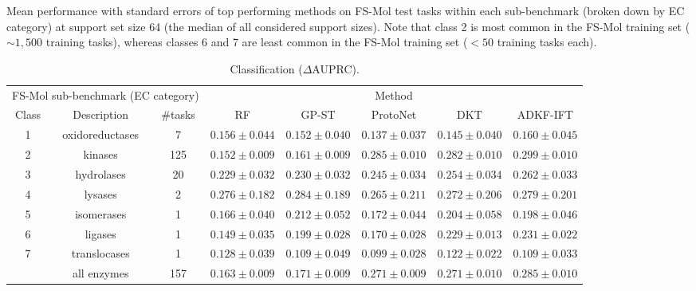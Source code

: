         \begin{table}[ht]
            \tiny
            \caption[Sub-benchmark results on FS-Mol.]{Mean performance with standard errors of top performing methods on FS-Mol test tasks within each sub-benchmark (broken down by EC category) at support set size 64 (the median of all considered support sizes). Note that class 2 is most common in the FS-Mol training set ($\sim 1,500$ training tasks), whereas classes 6 and 7 are least common in the FS-Mol training set ($<50$ training tasks each).}
            \label{tab:sub-benchmark}
            \begin{subtable}{1.0\linewidth}
                \caption{Classification ($\Delta$AUPRC).}
                \centering
                \begin{tabular}{cccccccc}
                \toprule
                \multicolumn{3}{c}{FS-Mol sub-benchmark (EC category)} & \multicolumn{5}{c}{Method} \\
                \cmidrule(lr){1-3}\cmidrule(lr){4-8}
                Class & Description & \#tasks & RF & GP-ST & ProtoNet & DKT & ADKF-IFT \\
                \midrule
                1 & oxidoreductases & 7 & $0.156\pm 0.044$ & $0.152\pm 0.040$ & $0.137\pm 0.037$ & $0.145\pm 0.040$ & $\mathbf{0.160\pm 0.045}$ \\
                2 & kinases & 125 & $0.152\pm 0.009$ & $0.161\pm 0.009$ & $0.285\pm 0.010$ & $0.282\pm 0.010$ & $\mathbf{0.299\pm 0.010}$ \\
                3 & hydrolases & 20 & $0.229\pm 0.032$ & $0.230\pm 0.032$ & $0.245\pm 0.034$ & $0.254\pm 0.034$ & $\mathbf{0.262\pm 0.033}$ \\
                4 & lysases & 2 & $0.276\pm 0.182$ & $\mathbf{0.284\pm 0.189}$ & $0.265\pm 0.211$ & $0.272\pm 0.206$ & $0.279\pm 0.201$ \\
                5 & isomerases & 1 & $0.166\pm 0.040$ & $\mathbf{0.212\pm 0.052}$ & $0.172\pm 0.044$ & $0.204\pm 0.058$ & $0.198\pm 0.046$ \\
                6 & ligases & 1 & $0.149\pm 0.035$ & $0.199\pm 0.028$ & $0.170\pm 0.028$ & $0.229\pm 0.013$ & $\mathbf{0.231\pm 0.022}$ \\
                7 & translocases & 1 & $\mathbf{0.128\pm 0.039}$ & $0.109\pm 0.049$ & $0.099\pm 0.028$ & $0.122\pm 0.022$ & $0.109\pm 0.033$ \\
                \midrule
                & all enzymes & 157 & $0.163\pm 0.009$ & $0.171\pm 0.009$ & $0.271\pm 0.009$ & $0.271\pm 0.010$ & $\mathbf{0.285\pm 0.010}$ \\
                \bottomrule
            \end{tabular}
            \end{subtable}
            

\end{table}
